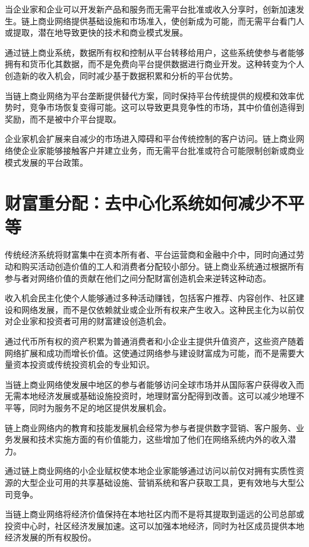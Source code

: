 \documentclass[
  Letterpaper,
]{scrbook}
\begin{document}
当企业家和企业可以开发新产品和服务而无需平台批准或收入分享时，创新加速发生。链上商业网络提供基础设施和市场准入，使创新成为可能，而无需平台看门人或提取，潜在地导致更快的技术和商业模式发展。

通过链上商业系统，数据所有权和控制从平台转移给用户，这些系统使参与者能够拥有和货币化其数据，而不是免费向平台提供数据进行商业开发。这种转变为个人创造新的收入机会，同时减少基于数据积累和分析的平台优势。

当链上商业网络为平台垄断提供替代方案，同时保持平台传统提供的规模和效率优势时，竞争市场恢复变得可能。这可以导致更具竞争性的市场，其中价值创造得到奖励，而不是被中介平台提取。

企业家机会扩展来自减少的市场进入障碍和平台传统控制的客户访问。链上商业网络使企业家能够接触客户并建立业务，而无需平台批准或符合可能限制创新或商业模式发展的平台政策。

\section{财富重分配：去中心化系统如何减少不平等}\label{ux8d22ux5bccux91cdux5206ux914dux53bbux4e2dux5fc3ux5316ux7cfbux7edfux5982ux4f55ux51cfux5c11ux4e0dux5e73ux7b49}

传统经济系统将财富集中在资本所有者、平台运营商和金融中介中，同时向通过劳动和购买活动创造价值的工人和消费者分配较小部分。链上商业系统通过根据所有参与者对网络价值的贡献在他们之间分配财富创造机会来逆转这种动态。

收入机会民主化使个人能够通过多种活动赚钱，包括客户推荐、内容创作、社区建设和网络发展，而不是仅依赖就业或企业所有权来产生收入。这种民主化为以前仅对企业家和投资者可用的财富建设创造机会。

通过代币所有权的资产积累为普通消费者和小企业主提供升值资产，这些资产随着网络扩展和成功而增长价值。这使通过网络参与建设财富成为可能，而不是需要大量资本投资或传统投资机会的专业知识。

当链上商业网络使发展中地区的参与者能够访问全球市场并从国际客户获得收入而无需本地经济发展或基础设施投资时，地理财富分配得到改善。这可以减少地理不平等，同时为服务不足的地区提供发展机会。

链上商业网络内的教育和技能发展机会经常为参与者提供数字营销、客户服务、业务发展和技术实施方面的有价值能力，这些增加了他们在网络系统内外的收入潜力。

通过链上商业网络的小企业赋权使本地企业家能够通过访问以前仅对拥有实质性资源的大型企业可用的共享基础设施、营销系统和客户获取工具，更有效地与大型公司竞争。

当链上商业网络将经济价值保持在本地社区内而不是将其提取到遥远的公司总部或投资中心时，社区经济发展加速。这可以加强本地经济，同时为社区成员提供本地经济发展的所有权股份。
\end{document}
